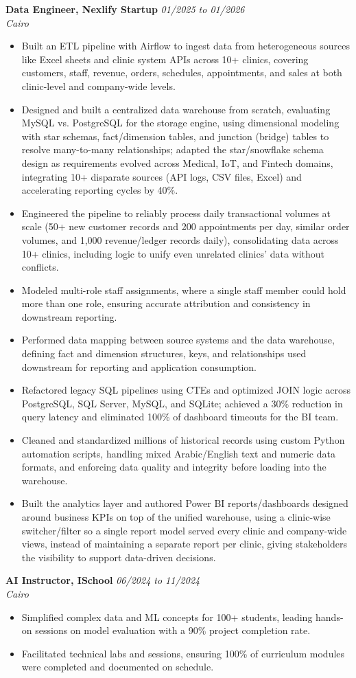 \documentclass[10pt,letterpaper]{article}
\newcommand{\resumeItem}[1]{%
    \item\small{#1}
}
\newcommand{\resumeSubheading}[4]{%
    \vspace{2pt}
    \textbf{#1} \hfill \textit{\small #2}\\
    \textit{\small #3} \hfill \textit{\small #4}
    \vspace{1pt}
}
\newcommand{\resumeItemListStart}{\begin{itemize}}
\newcommand{\resumeItemListEnd}{\end{itemize}\vspace{2pt}}
\begin{document}
\resumeSubheading
    {Data Engineer, Nexlify Startup}
    {01/2025 to 01/2026}
    {}
    {Cairo}
\resumeItemListStart
    \resumeItem{Built an ETL pipeline with Airflow to ingest data from heterogeneous sources like Excel sheets and clinic system APIs across 10+ clinics, covering customers, staff, revenue, orders, schedules, appointments, and sales at both clinic-level and company-wide levels.}
    \resumeItem{Designed and built a centralized data warehouse from scratch, evaluating MySQL vs. PostgreSQL for the storage engine, using dimensional modeling with star schemas, fact/dimension tables, and junction (bridge) tables to resolve many-to-many relationships; adapted the star/snowflake schema design as requirements evolved across Medical, IoT, and Fintech domains, integrating 10+ disparate sources (API logs, CSV files, Excel) and accelerating reporting cycles by 40\%.}
    \resumeItem{Engineered the pipeline to reliably process daily transactional volumes at scale (50+ new customer records and 200 appointments per day, similar order volumes, and 1,000 revenue/ledger records daily), consolidating data across 10+ clinics, including logic to unify even unrelated clinics' data without conflicts.}
    \resumeItem{Modeled multi-role staff assignments, where a single staff member could hold more than one role, ensuring accurate attribution and consistency in downstream reporting.}
    \resumeItem{Performed data mapping between source systems and the data warehouse, defining fact and dimension structures, keys, and relationships used downstream for reporting and application consumption.}
    \resumeItem{Refactored legacy SQL pipelines using CTEs and optimized JOIN logic across PostgreSQL, SQL Server, MySQL, and SQLite; achieved a 30\% reduction in query latency and eliminated 100\% of dashboard timeouts for the BI team.}
    \resumeItem{Cleaned and standardized millions of historical records using custom Python automation scripts, handling mixed Arabic/English text and numeric data formats, and enforcing data quality and integrity before loading into the warehouse.}
    \resumeItem{Built the analytics layer and authored Power BI reports/dashboards designed around business KPIs on top of the unified warehouse, using a clinic-wise switcher/filter so a single report model served every clinic and company-wide views, instead of maintaining a separate report per clinic, giving stakeholders the visibility to support data-driven decisions.}
\resumeItemListEnd

\resumeSubheading
    {AI Instructor, ISchool}
    {06/2024 to 11/2024}
    {}
    {Cairo}
\resumeItemListStart
    \resumeItem{Simplified complex data and ML concepts for 100+ students, leading hands-on sessions on model evaluation with a 90\% project completion rate.}
    \resumeItem{Facilitated technical labs and sessions, ensuring 100\% of curriculum modules were completed and documented on schedule.}
\resumeItemListEnd
\end{document}
